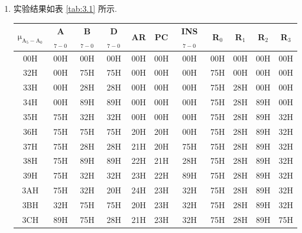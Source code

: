 \documentclass[../main.tex]{subfiles}
\begin{document}
\begin{enumerate}
    \item 实验结果如表 \ref{tab:3.1} 所示.

          \begin{table}[h]
              \centering
              \begin{tabular}{ccccccccccc}
                  \Xhline{1pt}
                  $\mathrm{\mu_{A_{5}-A_{0}}}$ & A$_{7-0}$ & B$_{7-0}$ & D$_{7-0}$ & AR  & PC  & INS$_{7-0}$ & R$_0$ & R$_1$ & R$_2$ & R$_3$ \\ \hline
                  00H                          & 00H       & 00H       & 00H       & 00H & 00H & 00H         & 00H   & 00H   & 00H   & 00H   \\
                  32H                          & 00H       & 75H       & 75H       & 00H & 00H & 00H         & 75H   & 00H   & 00H   & 00H   \\
                  33H                          & 00H       & 28H       & 28H       & 00H & 00H & 00H         & 75H   & 28H   & 00H   & 00H   \\
                  34H                          & 00H       & 89H       & 89H       & 00H & 00H & 00H         & 75H   & 28H   & 89H   & 00H   \\
                  35H                          & 75H       & 32H       & 32H       & 00H & 00H & 00H         & 75H   & 28H   & 89H   & 32H   \\
                  36H                          & 75H       & 75H       & 75H       & 20H & 20H & 00H         & 75H   & 28H   & 89H   & 32H   \\
                  37H                          & 75H       & 28H       & 28H       & 21H & 20H & 75H         & 75H   & 28H   & 89H   & 32H   \\
                  38H                          & 75H       & 89H       & 89H       & 22H & 21H & 28H         & 75H   & 28H   & 89H   & 32H   \\
                  39H                          & 75H       & 32H       & 32H       & 23H & 22H & 89H         & 75H   & 28H   & 89H   & 32H   \\
                  3AH                          & 75H       & 32H       & 20H       & 24H & 23H & 32H         & 75H   & 28H   & 89H   & 32H   \\
                  3BH                          & 32H       & 75H       & 75H       & 20H & 23H & 32H         & 75H   & 28H   & 89H   & 32H   \\
                  3CH                          & 89H       & 75H       & 28H       & 21H & 23H & 32H         & 75H   & 28H   & 89H   & 75H   \\

\end{tabular}
\end{table}
\end{enumerate}
\end{document}
